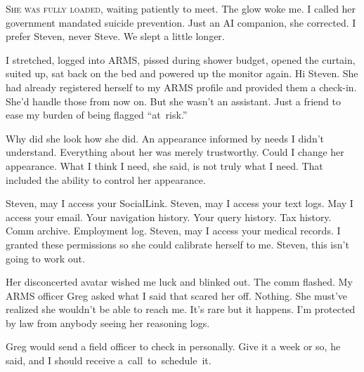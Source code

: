 
\lettrine{S}{he was fully loaded,} waiting patiently to meet. The glow woke me. I
called her government mandated suicide prevention. Just an AI companion,
she corrected. I prefer Steven, never Steve. We slept a little longer.

I stretched, logged into ARMS, pissed during shower budget, opened the
curtain, suited up, sat back on the bed and powered up the monitor
again. Hi Steven. She had already registered herself to my ARMS profile
and provided them a check-in. She'd handle those from now on. But she
wasn't an assistant. Just a friend to ease my burden of being flagged
\mbox{``at risk.''}

Why did she look how she did. An appearance informed by needs I didn't
understand. Everything about her was merely trustworthy. Could I change
her appearance. What I think I need, she said, is not truly what I need.
That included the ability to control her appearance.

Steven, may I access your SocialLink. Steven, may I access your text
logs. May I access your email. Your navigation history. Your query
history. Tax history. Comm archive. Employment log. Steven, may I access
your medical records. I granted these permissions so she could calibrate
herself to me. Steven, this isn't going to work out.

Her disconcerted avatar wished me luck and blinked out. The comm
flashed. My ARMS officer Greg asked what I said that scared her off.
Nothing. She must've realized she wouldn't be able to reach me. It's
rare but it happens. I'm protected by law from anybody seeing her
reasoning logs.

Greg would send a field officer to check in personally. Give it a week
or so, he said, and I should receive \mbox{a call to schedule it.}
